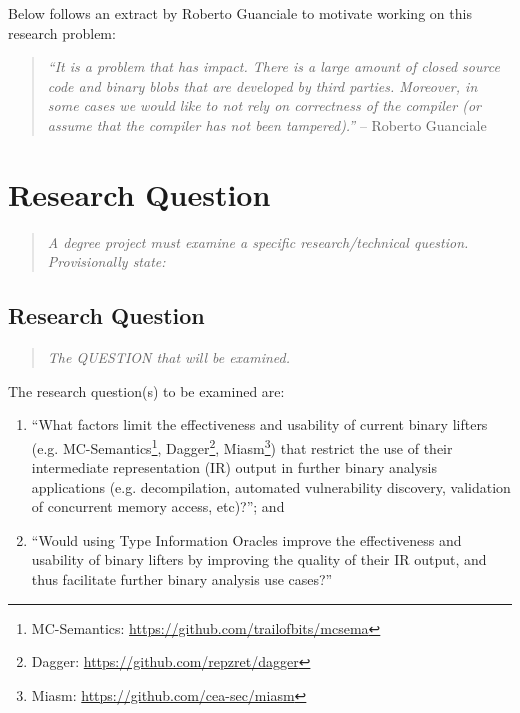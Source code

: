 \documentclass[12pt, a4paper]{article}
\begin{document}
Below follows an extract by Roberto Guanciale to motivate working on this research problem:

\begin{quote}
	\textit{``It is a problem that has impact. There is a large amount of closed source code and binary blobs that are developed by third parties. Moreover, in some cases we would like to not rely on correctness of the compiler (or assume that the compiler has not been tampered).''} -- Roberto Guanciale
\end{quote}


\section{Research Question}

\begin{quote}
	\textit{A degree project must examine a specific research/technical question. Provisionally state:}
\end{quote}

\subsection{Research Question}

\begin{quote}
	\textit{The QUESTION that will be examined.}
\end{quote}

The research question(s) to be examined are:

\begin{enumerate}
	\item ``What factors limit the effectiveness and usability of current binary lifters (e.g. MC-Semantics\footnote{MC-Semantics: \url{https://github.com/trailofbits/mcsema}}, Dagger\footnote{Dagger: \url{https://github.com/repzret/dagger}}, Miasm\footnote{Miasm: \url{https://github.com/cea-sec/miasm}}) that restrict the use of their intermediate representation (IR) output in further binary analysis applications (e.g. decompilation, automated vulnerability discovery, validation of concurrent memory access, etc)?''; and
	\item ``Would using Type Information Oracles improve the effectiveness and usability of binary lifters by improving the quality of their IR output, and thus facilitate further binary analysis use cases?''
\end{enumerate}
\end{document}
